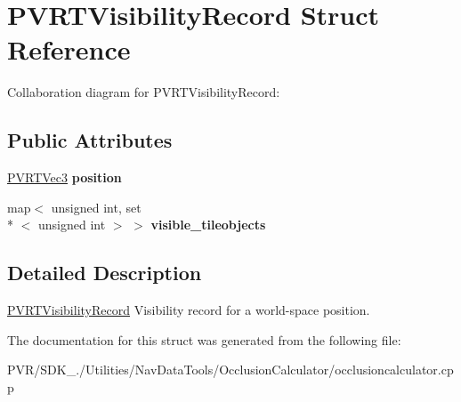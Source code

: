 \hypertarget{struct_p_v_r_t_visibility_record}{\section{P\+V\+R\+T\+Visibility\+Record Struct Reference}
\label{struct_p_v_r_t_visibility_record}
}


Collaboration diagram for P\+V\+R\+T\+Visibility\+Record\+:
\subsection*{Public Attributes}
\begin{DoxyCompactItemize}
\item 
\hypertarget{struct_p_v_r_t_visibility_record_a9f4a10f96e7f889c3f53e70effe29e88}{\hyperlink{struct_p_v_r_t_vec3}{P\+V\+R\+T\+Vec3} {\bfseries position}}\label{struct_p_v_r_t_visibility_record_a9f4a10f96e7f889c3f53e70effe29e88}

\item 
\hypertarget{struct_p_v_r_t_visibility_record_a69ae26a401a658d4bc6c74233b1f712c}{map$<$ unsigned int, set\\*
$<$ unsigned int $>$ $>$ {\bfseries visible\+\_\+tileobjects}}\label{struct_p_v_r_t_visibility_record_a69ae26a401a658d4bc6c74233b1f712c}

\end{DoxyCompactItemize}


\subsection{Detailed Description}


  \hyperlink{struct_p_v_r_t_visibility_record}{P\+V\+R\+T\+Visibility\+Record}  Visibility record for a world-\/space position. 

The documentation for this struct was generated from the following file\+:\begin{DoxyCompactItemize}
\item 
P\+V\+R/\+S\+D\+K\+\_./\+Utilities/\+Nav\+Data\+Tools/\+Occlusion\+Calculator/occlusioncalculator.\+cpp\end{DoxyCompactItemize}
